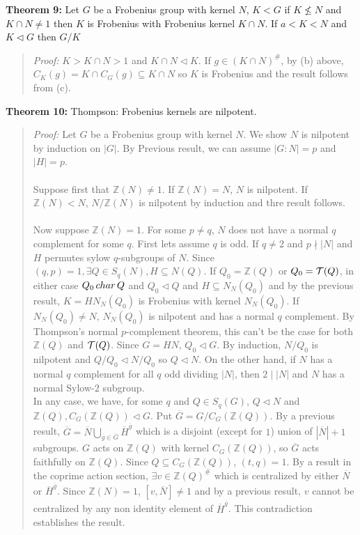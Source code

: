 {\bf Theorem 9:} 
Let $G$ be a Frobenius group with kernel $N$, $K <G$ if $K \nleq N$ and $K \cap N \ne 1$ then $K$ is
Frobenius with Frobenius kernel
$K \cap N$. If $a < K <N$ and $K \lhd G$ then $G/K$
\begin{quote}
\emph{Proof:}
$K > K \cap N > 1$  and $K \cap N \lhd K$.  If $g \in (K \cap N)^{\#}$, by (b) above, $C_K(g) = K \cap C_G(g) \subseteq K \cap N$
so $K$ is Frobenius and the result follows from (c).
\end{quote}
{\bf Theorem 10:} 
Thompson: Frobenius kernels are nilpotent.
\begin{quote}
\emph{Proof:}
Let $G$ be a Frobenius group with kernel $N$.  We show $N$ is nilpotent by induction on $|G|$.  By
Previous result, we can assume $|G:N|=p$ and $|H|=p$.\\
\\
Suppose first that ${\mathbb Z}(N) \ne 1$.  If ${\mathbb Z}(N) = N$, $N$ is nilpotent.  If  ${\mathbb Z}(N) < N$, $N/{\mathbb Z}(N)$ is
nilpotent by induction and thre result follows.\\
\\
Now suppose ${\mathbb Z}(N) = 1$. For some $p \ne q$, $N$ does not have a normal $q$ complement for some $q$.  First
lets assume $q$ is odd. If $q \ne 2$ and $p \nmid |N|$ and $H$ permutes sylow $q$-subgroups of $N$.   Since 
$(q, p) =1, \exists Q \in S_q(N), H \subseteq N(Q)$.  If $Q_0 = {\mathbb Z}(Q)$ or $Q_0 = {\cal T}(Q)$, in either case
$Q_0 \thinspace char \thinspace Q$ and $Q_0 \lhd Q$ and $H \subseteq N_N(Q_0)$ and by the previous result,
$K= H N_N(Q_0)$ is Frobenius with kernel $N_N(Q_0)$.  If $N_N(Q_0) \ne N$, $N_N(Q_0)$ is nilpotent and has a normal $q$
complement.  By Thompson's normal $p$-complement theorem, this can't be the case for both ${\mathbb Z}(Q)$ and ${\cal T}(Q)$.
Since $G = HN$, $Q_0 \lhd G$.  By induction, $N/Q_0$ is nilpotent and $Q/Q_0 \lhd N/Q_0$ so $Q \lhd N$.  On the other
hand, if $N$ has a normal $q$ complement for all $q$ odd dividing $|N|$, then $2 \mid |N|$ and $N$ has a normal
Sylow-$2$ subgroup.\\
In any case, we have, for some $q$ and $Q \in S_q(G)$, $Q \lhd N$ and ${\mathbb Z}(Q), C_G({\mathbb Z}(Q)) \lhd G$.
Put ${\overline G} = G/C_G({\mathbb Z}(Q))$.  By a previous result,
${\overline G} = {\overline N} \bigcup_{{\overline g} \in {\overline G}} {\overline H}^{\overline g}$ which is a disjoint
(except for $1$) union of $|{\overline N}|+1$ subgroups.
$G$ acts on ${\mathbb Z}(Q)$ with kernel $C_G({\mathbb Z}(Q))$, so ${\overline G}$ acts faithfully on ${\mathbb Z}(Q)$.
Since $Q \subseteq C_G({\mathbb Z}(Q))$, $(t, q) =1$.
By a result in the coprime action section, $\exists v \in {\mathbb Z}(Q)^{\#}$ which is centralized by either ${\overline N}$
or ${\overline H}^{\overline g}$.  Since ${\mathbb Z}(N) = 1$, $[v, {\overline N}] \ne 1$ and by a previous result,
$v$ cannot be centralized by any non identity element of ${\overline H}^{\overline g}$.  This contradiction establishes the result.
\end{quote}
